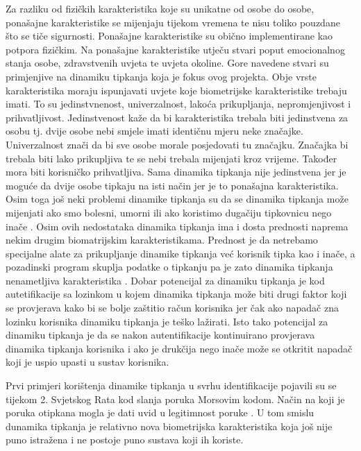 \documentclass[]{foi}
\begin{document}
Za razliku od fizičkih karakteristika koje su unikatne od osobe do osobe, ponašajne karakteristike se mijenjaju tijekom vremena te nisu toliko pouzdane što se tiče sigurnosti. Ponašajne karakteristike su obično implementirane kao potpora fizičkim. Na ponašajne karakteristike utječu stvari poput emocionalnog stanja osobe, zdravstvenih uvjeta te uvjeta okoline. Gore navedene stvari su primjenjive na dinamiku tipkanja koja je fokus ovog projekta. Obje vrste karakteristika moraju ispunjavati uvjete koje biometrijske karakteristike trebaju imati. To su jedinstvnenost, univerzalnost, lakoća prikupljanja, nepromjenjivost i prihvatljivost.\cite{Kasprowski2022} Jedinstvenost kaže da bi karakteristika trebala biti jedinstvena za osobu tj. dvije osobe nebi smjele imati identičnu mjeru neke značajke. Univerzalnost znači da bi sve osobe morale posjedovati tu značajku. Značajka bi trebala biti lako prikupljiva te se nebi trebala mijenjati kroz vrijeme. Također mora biti korisničko prihvatljiva. Sama dinamika tipkanja nije jedinstvena jer je moguće da dvije osobe tipkaju na isti način jer je to ponašajna karakteristika. Osim toga još neki problemi dinamike tipkanja su da se dinamika tipkanja može mijenjati ako smo bolesni, umorni ili ako koristimo dugačiju tipkovnicu nego inače \cite{Chang2021}. Osim ovih nedostataka dinamika tipkanja ima i dosta prednosti naprema nekim drugim biomatrijskim karakteristikama. Prednost je da netrebamo specijalne alate za prikupljanje dinamike tipkanja već korisnik tipka kao i inače, a pozadinski program skuplja podatke o tipkanju pa je zato dinamika tipkanja nenametljiva karakteristika \cite{Chang2021}. Dobar potencijal za dinamiku tipkanja je kod autetifikacije sa lozinkom u kojem dinamika tipkanja može biti drugi faktor koji se provjerava kako bi se bolje zaštitio račun korisnika jer čak ako napadač zna lozinku korisnika dinamiku tipkanja je teško lažirati. Isto tako potencijal za dinamiku tipkanja je da se nakon autentifikacije kontinuirano provjerava dinamika tipkanja korisnika i ako je drukčija nego inače može se otkritit napadač koji je uspio upasti u sustav korisnika.

Prvi primjeri korištenja dinamike tipkanja u svrhu identifikacije pojavili su se tijekom 2. Svjetskog Rata kod slanja poruka Morsovim kodom. Način na koji je poruka otipkana mogla je dati uvid u legitimnost poruke \cite{Haring2007}. U tom smislu dunamika tipkanja je relativno nova biometrijska karakteristika koja još nije puno istražena i ne postoje puno sustava koji ih koriste. 
\end{document}
